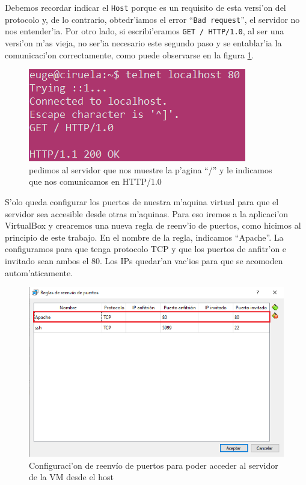 \documentclass[11pt]{article}
\begin{document}
		Debemos recordar indicar el \texttt{Host} porque es un requisito de esta versi'on del protocolo y, de lo contrario, obtedr'iamos el error ``\texttt{Bad request}'', el servidor no nos entender'ia. Por otro lado, si escribi'eramos \texttt{GET / HTTP/1.0}, al ser una versi'on m'as vieja, no ser'ia necesario este segundo paso y se entablar'ia la comunicaci'on correctamente, como puede observarse en la figura \ref{fig:5}.

		\begin{figure}[H]
    			\centering
    			\includegraphics[scale=0.6]{Images/Apache/fig5_.png}
    			\caption{pedimos al servidor que nos muestre la p'agina ``/'' y le indicamos que nos comunicamos en HTTP/1.0}
    			\label{fig:5}
		\end{figure}

		S'olo queda configurar los puertos de nuestra m'aquina virtual para que el servidor sea accesible desde otras m'aquinas. Para eso iremos a la aplicaci'on VirtualBox y crearemos una nueva regla de reenv'io de puertos, como hicimos al principio de este trabajo. En el nombre de la regla, indicamos ``Apache''. La configuramos para que tenga protocolo TCP y que los puertos de anfitr'on e invitado sean ambos el 80. Los IPs quedar'an vac'ios para que se acomoden autom'aticamente.

		\begin{figure}[H]
    			\centering \captionsetup{justification=centering}
    			\includegraphics[scale=0.65]{Images/Apache/fig6.png}
   			\caption{Configuraci'on de reenvío de puertos para poder acceder al servidor de la VM desde el host}
    			\label{fig:6}
		\end{figure}
\end{document}
